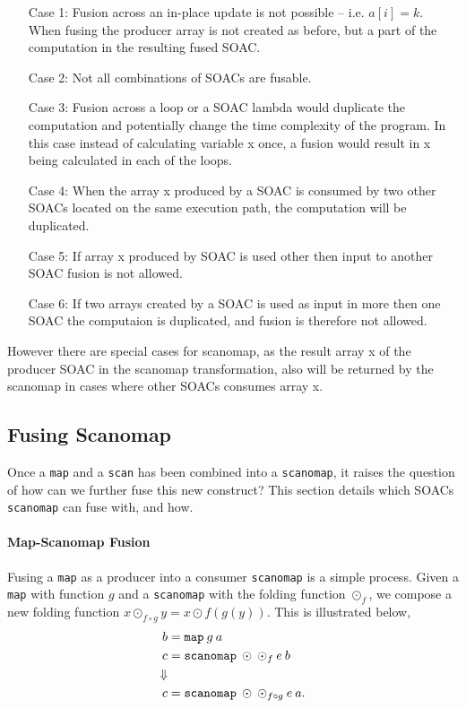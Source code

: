 \documentclass[11pt]{article}
\begin{document}
\begin{itemize}
\item[Case 1:] Fusion across an in-place update is not possible -- i.e. $a[i] = k$. When fusing the producer array is not created as before, but a part of the computation in the resulting fused SOAC.
\item[Case 2:] Not all combinations of SOACs are fusable.
\item[Case 3:] Fusion across a loop or a SOAC lambda would duplicate the computation and potentially change the time complexity of the program. In this case instead of calculating variable x once, a fusion would result in x being calculated in each of the loops. 
\item[Case 4:] When the array x produced by a SOAC is consumed by two other SOACs located on the same execution path, the computation will be duplicated.
\item[Case 5:] If array x produced by SOAC is used other then input to another SOAC fusion is not allowed.
\item[Case 6:] If two arrays created by a SOAC is used as input in more then one SOAC the computaion is duplicated, and fusion is therefore not allowed.
\end{itemize}

However there are special cases for scanomap, as the result array x of the producer SOAC in the scanomap transformation, also will be returned by the scanomap in cases where other SOACs consumes array x.


\subsection{Fusing Scanomap}
Once a \texttt{map} and a \texttt{scan} has been combined into a \texttt{scanomap}, it raises the question of how can we further fuse this new construct?
 This section details which SOACs \texttt{scanomap} can fuse with, and how.
\paragraph{Map-Scanomap Fusion}
Fusing a \texttt{map} as a producer into a consumer \texttt{scanomap} is a simple process. Given a \texttt{map} with function $g$ and a 
 \texttt{scanomap} with the folding function $\odot_f$, we compose a new folding function $x \odot_{f \circ g} y = x \odot f (g (y))$. This is illustrated below,
\begin{align*}
  b &= \mathtt{map} \: g \: a \\
  c &= \mathtt{scanomap} \: \odot \: \odot_f \: e \: b \\
\Downarrow \\
  c &= \mathtt{scanomap} \: \odot \: \odot_{f\circ g} \: e \: a\mathnormal{.}
\end{align*}
\end{document}
